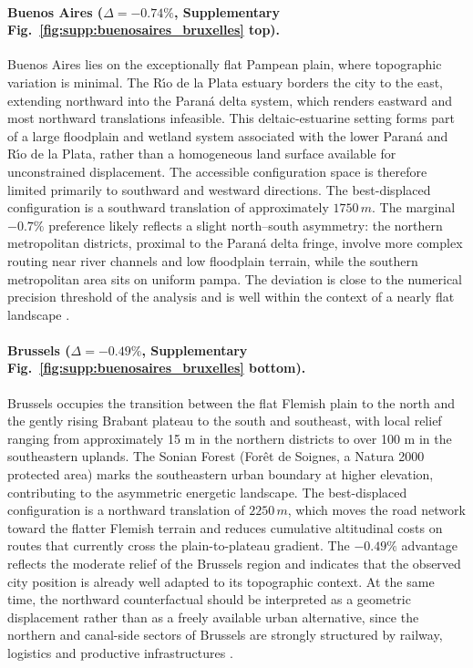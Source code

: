 \documentclass[11pt]{article}
\begin{document}
\paragraph{Buenos Aires ($\Delta = -0.74\%$, Supplementary Fig.~\ref{fig:supp:buenosaires_bruxelles} top).} Buenos Aires lies on the exceptionally flat Pampean plain, where topographic variation is minimal. The R\'{\i}o de la Plata estuary borders the city to the east, extending northward into the Paran\'a delta system, which renders eastward and most northward translations infeasible. This deltaic-estuarine setting forms part of a large floodplain and wetland system associated with the lower Paran\'a and R\'{\i}o de la Plata, rather than a homogeneous land surface available for unconstrained displacement. The accessible configuration space is therefore limited primarily to southward and westward directions. The best-displaced configuration is a southward translation of approximately $1750\, m$. The marginal $-0.7\%$ preference likely reflects a slight north–south asymmetry: the northern metropolitan districts, proximal to the Paran\'a delta fringe, involve  more complex routing near river channels and low floodplain terrain, while the southern metropolitan area sits on uniform pampa. The deviation is close to the numerical precision threshold of the analysis and is well within the context of a nearly flat landscape \cite{ba1,ba2,ba3,ba4}.

\paragraph{Brussels ($\Delta = -0.49\%$, Supplementary Fig.~\ref{fig:supp:buenosaires_bruxelles} bottom).}

Brussels occupies the transition between the flat Flemish plain to the north and the gently rising Brabant plateau to the south and southeast, with local relief ranging from approximately 15 m in the northern districts to over 100 m in the southeastern uplands. The Sonian Forest (For\^et de Soignes, a Natura 2000 protected area) marks the southeastern urban boundary at higher elevation, contributing to the asymmetric energetic landscape. The best-displaced configuration is a northward translation of $2250\,m$, which moves the road network toward the flatter Flemish terrain and reduces cumulative altitudinal costs on routes that currently cross the plain-to-plateau gradient. The $−0.49\%$ advantage reflects the moderate relief of the Brussels region and indicates that the observed city position is already well adapted to its topographic context. At the same time, the northward counterfactual should be interpreted as a geometric displacement rather than as a freely available urban alternative, since the northern and canal-side sectors of Brussels are strongly structured by railway, logistics and productive infrastructures \cite{bu1,bu2}.
\end{document}
